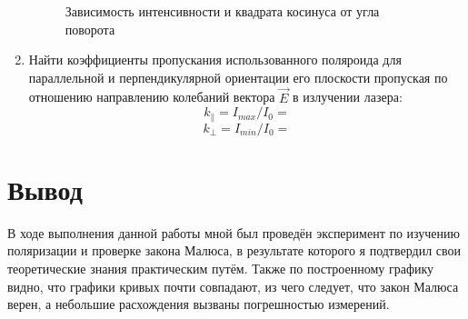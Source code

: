 \documentclass[12pt]{article}
\begin{document}
\begin{enumerate}[wide, labelwidth=!, labelindent=0pt]
\begin{figure}[h!]
            \label{graph:1}
            \caption{Зависимость интенсивности и квадрата косинуса от угла поворота }
            \centering
        \end{figure}
        \item Найти коэффициенты пропускания использованного поляроида для параллельной и перпендикулярной ориентации его плоскости пропуская по отношению направлению колебаний вектора $ \vec{E} $ в излучении лазера:
        $$ k_{\parallel } = I_{max} / I_0 = %
        $$
        $$ k_{\bot } = I_{min} / I_0 = %
        $$
    \end{enumerate}

    \section*{Вывод}

    В ходе выполнения данной работы мной был проведён эксперимент по изучению поляризации и проверке закона Малюса, в результате которого я подтвердил свои теоретические знания практическим путём. Также по построенному графику видно, что графики кривых почти совпадают, из чего следует, что закон Малюса верен, а небольшие расхождения вызваны погрешностью измерений.
\end{document}
